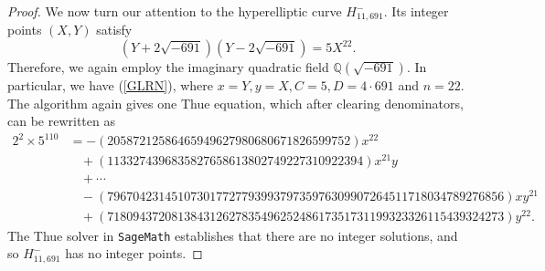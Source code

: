 \documentclass[12pt]{amsart}
\newcommand{\Q}{\mathbb{Q}}
\numberwithin{equation}{section}
\begin{document}
\begin{proof}
We now turn our attention to the hyperelliptic curve $H^{-}_{11,691}.$  Its integer points $(X,Y)$  satisfy
$$
(Y+2\sqrt{-691})(Y-2\sqrt{-691})=5X^{22}.
$$
Therefore, we again employ the imaginary quadratic field $\Q(\sqrt{-691})$. In particular, we have (\ref{GLRN}), where $x=Y, y=X, C=5, D=4\cdot 691$ and $n=22$.
 The algorithm again gives one Thue equation, which after clearing denominators, can be rewritten as
\small 
\begin{displaymath}
\begin{split}
2^2\times5^{110}&=
-(20587212586465949627980680671826599752) x^{22} \\
&\ \  \ \   + (1133274396835827658613802749227310922394) x^{21} y\\ 
&\ \ \ \ +\cdots\\
 &\ \ \ \  -(79670423145107301772779399379735976309907264511718034789276856) x y^{21}\\
&\ \ \ \  +(71809437208138431262783549625248617351731199323326115439324273)y^{22}.
 \end{split}
 \end{displaymath}
\normalsize
The Thue solver in \texttt{SageMath} establishes that there are no integer solutions, and so $H^{-}_{11,691}$ has no integer points.

\end{proof}
\end{document}

